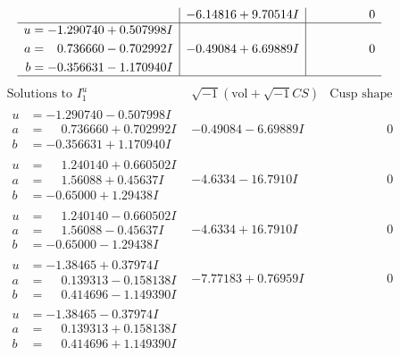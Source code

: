 \documentclass[1p]{elsarticle_modified}
\theoremstyle{definition}
\newcommand{\I}{\sqrt{-1}}
\begin{document}
$$\begin{array}{c|c|c}
 & -6.14816 + 9.70514 I & \phantom{-0.000000 } 0 \\ \hline\begin{aligned}
u &= -1.290740 + 0.507998 I \\
a &= \phantom{-}0.736660 - 0.702992 I \\
b &= -0.356631 - 1.170940 I\end{aligned}
 & -0.49084 + 6.69889 I & \phantom{-0.000000 } 0\\
 \hline 
 \end{array}$$\newpage$$\begin{array}{c|c|c}  
\text{Solutions to }I^u_{1}& \I (\text{vol} + \sqrt{-1}CS) & \text{Cusp shape}\\
 \hline 
\begin{aligned}
u &= -1.290740 - 0.507998 I \\
a &= \phantom{-}0.736660 + 0.702992 I \\
b &= -0.356631 + 1.170940 I\end{aligned}
 & -0.49084 - 6.69889 I & \phantom{-0.000000 } 0 \\ \hline\begin{aligned}
u &= \phantom{-}1.240140 + 0.660502 I \\
a &= \phantom{-}1.56088 + 0.45637 I \\
b &= -0.65000 + 1.29438 I\end{aligned}
 & -4.6334 - 16.7910 I & \phantom{-0.000000 } 0 \\ \hline\begin{aligned}
u &= \phantom{-}1.240140 - 0.660502 I \\
a &= \phantom{-}1.56088 - 0.45637 I \\
b &= -0.65000 - 1.29438 I\end{aligned}
 & -4.6334 + 16.7910 I & \phantom{-0.000000 } 0 \\ \hline\begin{aligned}
u &= -1.38465 + 0.37974 I \\
a &= \phantom{-}0.139313 - 0.158138 I \\
b &= \phantom{-}0.414696 - 1.149390 I\end{aligned}
 & -7.77183 + 0.76959 I & \phantom{-0.000000 } 0 \\ \hline\begin{aligned}
u &= -1.38465 - 0.37974 I \\
a &= \phantom{-}0.139313 + 0.158138 I \\
b &= \phantom{-}0.414696 + 1.149390 I\end{aligned}

\end{array}$$
\end{document}
